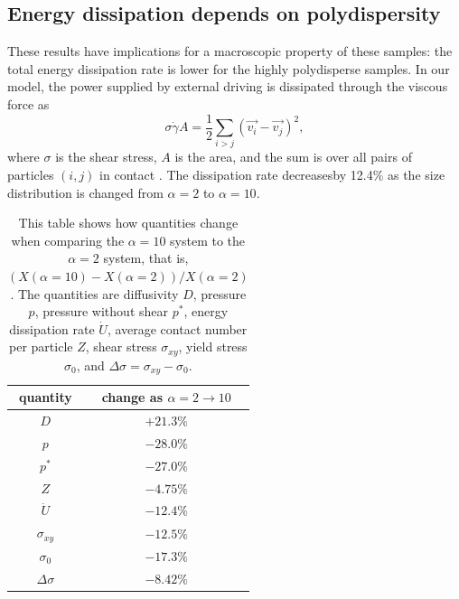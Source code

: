 \documentclass[%
 reprint,
 amsmath,amssymb,
 aps,
]{revtex4-2}
\begin{document}
\subsection{Energy dissipation depends on polydispersity}

These results have implications for a macroscopic property of these samples:  the total energy dissipation rate is lower for the highly polydisperse samples.  In our model, the power supplied by external driving is dissipated through the viscous force as 
\begin{equation}
    \sigma \dot{\gamma} A = \frac{1}{2} \sum_{i > j} (\vec{v_i}-\vec{v_j})^2,
\end{equation}
where $\sigma$ is the shear stress, $A$ is the area, and the sum is over all pairs of particles $(i,j)$ in contact \cite{tighe10}. 
The dissipation rate decreasesby 12.4\% as the size distribution is changed from $\alpha=2$ to $\alpha=10$.


\begin{table}
    \centering
    \begin{tabular}{|c|c|}
    \hline
    quantity & change as $\alpha = 2 \rightarrow 10$\\
    \hline
    $D$ & $+21.3\%$ \\
    $p$ & $-28.0\%$ \\
    $p^{*}$ & $-27.0\%$ \\
    $Z$ & $-4.75\%$ \\
    $\dot{U}$ & $-12.4\%$\\
    $\sigma_{xy}$ & $-12.5\%$ \\
    $\sigma_0$ & $-17.3\%$ \\
    $\Delta \sigma$ & $-8.42\%$ \\
    \hline
    \end{tabular}
    \caption{This table shows how quantities change when comparing the $\alpha=10$ system to the $\alpha=2$ system, that is, $(X(\alpha=10)-X(\alpha=2))/X(\alpha=2)$.  The quantities are diffusivity $D$, pressure $p$, pressure without shear $p^{*}$, energy dissipation rate $\dot{U}$, average contact number per particle $Z$, shear stress $\sigma_{xy}$, yield stress $\sigma_0$, and $\Delta \sigma = \sigma_{xy} - \sigma_0$. }
    \label{tab:percents}
\end{table}
\end{document}
